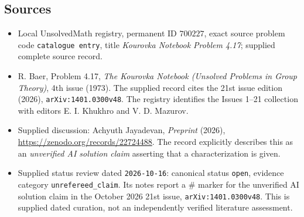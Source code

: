 \documentclass[11pt]{article}
\begin{document}
\subsection{Sources}
\begin{itemize}
\item Local UnsolvedMath registry, permanent ID \(700227\), exact source problem code \texttt{catalogue entry}, title \emph{Kourovka Notebook Problem 4.17}; supplied complete source record.
\item R. Baer, Problem 4.17, \emph{The Kourovka Notebook (Unsolved Problems in Group Theory)}, 4th issue (1973). The supplied record cites the 21st issue edition (2026), \texttt{arXiv:1401.0300v48}. The registry identifies the Issues 1--21 collection with editors E. I. Khukhro and V. D. Mazurov.
\item Supplied discussion: Achyuth Jayadevan, \emph{Preprint} (2026), \url{https://zenodo.org/records/22724488}. The record explicitly describes this as an \emph{unverified AI solution claim} asserting that a characterization is given.
\item Supplied status review dated \texttt{2026-10-16}: canonical status \texttt{open}, evidence category \texttt{unrefereed\_claim}. Its notes report a \(\#\) marker for the unverified AI solution claim in the October 2026 21st issue, \texttt{arXiv:1401.0300v48}. This is supplied dated curation, not an independently verified literature assessment.
\end{itemize}
\end{document}
